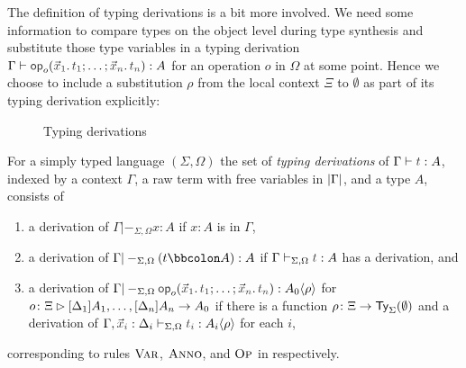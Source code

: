 The definition of typing derivations is a bit more involved.
We need some information to compare types on the object level during type synthesis and substitute those type variables in a typing derivation $\Gamma \vdash \tmOpts : A$ for an operation $o$ in $\Omega$ at some point.
Hence we choose to include a substitution $\rho$ from the local context $\Xi$ to $\emptyset$ as part of its typing derivation explicitly:
\begin{definition}\label{def:typing-derivations}
  \begin{figure}
    \centering
    \small
    \caption{Typing derivations}
    \label{fig:extrinsic-typing}
  \end{figure}
  For a simply typed language $(\Sigma, \Omega)$ the set of \emph{typing derivations} of $\Gamma \vdash \isTerm{t} : A$, indexed by a context $\Gamma$, a raw term with free variables in $\left|\Gamma\right|$, and a type $A$, consists of 
  \begin{enumerate}
    \item a derivation of $\Gamma |-_{\Sigma, \Omega} x : A$ if $x : A$ is in $\Gamma$,
    \item a derivation of $\Gamma |-_{\Sigma, \Omega} (t \annotate A) : A$ if $\Gamma \vdash_{\Sigma, \Omega} \isTerm{t} : A$ has a derivation, and
    \item a derivation of $\Gamma |-_{\Sigma, \Omega} \tmOpts : \simsub{A_0}{\rho}$ for $o\colon \Xi \rhd [\Delta_1]A_1, \ldots, [\Delta_{n}]A_{n} \to A_0$ if there is a function $\rho\colon \Xi \to \mathsf{Ty}_{\Sigma}(\emptyset)$ and a derivation of $\Gamma, \vars{x}_{\isTerm{i}} : \Delta_i \vdash_{\Sigma, \Omega} \isTerm{t_i} : \simsub{A_i}{\rho}$ for each $i$,
  \end{enumerate}
  corresponding to rules $\textnormal{\textsc{Var}}$, $\textnormal{\textsc{Anno}}$, and $\textnormal{\textsc{Op}}$ in  respectively.
\end{definition}

